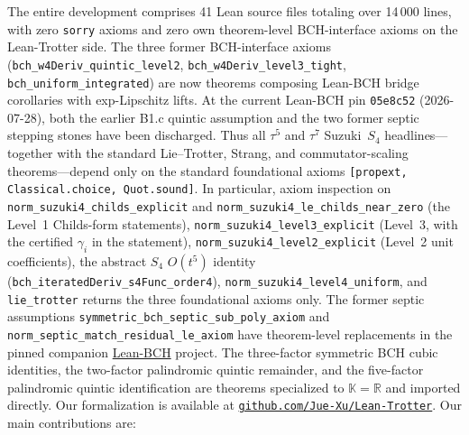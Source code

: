 The entire development comprises 41 Lean source files totaling over 14\,000 lines,
with zero \texttt{sorry} axioms and zero own theorem-level BCH-interface
axioms on the Lean-Trotter side. The three former BCH-interface axioms
(\texttt{bch\_w4Deriv\_quintic\_level2},
\texttt{bch\_w4Deriv\_level3\_tight},
\texttt{bch\_uniform\_integrated})
are now theorems composing Lean-BCH bridge corollaries with
exp-Lipschitz lifts. At the current Lean-BCH pin \texttt{05e8c52}
(2026-07-28), both the earlier B1.c quintic assumption and the two
former septic stepping stones have been discharged. Thus all
$\tau^5$ and $\tau^7$ Suzuki~$S_4$ headlines---together with the
standard Lie--Trotter, Strang, and commutator-scaling theorems---depend
only on the standard foundational axioms \texttt{[propext,
Classical.choice, Quot.sound]}. In particular, axiom inspection on
\texttt{norm\_suzuki4\_childs\_explicit} and
\texttt{norm\_suzuki4\_le\_childs\_near\_zero} (the Level~1 Childs-form
statements), \texttt{norm\_suzuki4\_level3\_explicit} (Level~3, with the
certified $\gamma_i$ in the statement), \texttt{norm\_suzuki4\_level2\_explicit}
(Level~2 unit coefficients), the abstract $S_4$ $O(t^5)$ identity
(\texttt{bch\_iteratedDeriv\_s4Func\_order4}),
\texttt{norm\_suzuki4\_level4\_uniform}, and \texttt{lie\_trotter}
returns the three foundational axioms only. The former septic
assumptions \texttt{symmetric\_bch\_septic\_sub\_poly\_axiom} and
\texttt{norm\_septic\_match\_residual\_le\_axiom} have theorem-level
replacements in the pinned companion
\href{https://github.com/Jue-Xu/Lean-BCH}{Lean-BCH} project. The
three-factor symmetric BCH
cubic identities, the two-factor palindromic quintic remainder, and
the five-factor palindromic quintic identification are theorems
specialized to $\mathbb{K} = \mathbb{R}$ and imported directly.
Our \Lean formalization is available at
\href{https://github.com/Jue-Xu/Lean-Trotter}{\texttt{github.com/Jue-Xu/Lean-Trotter}}.
Our main contributions are:
